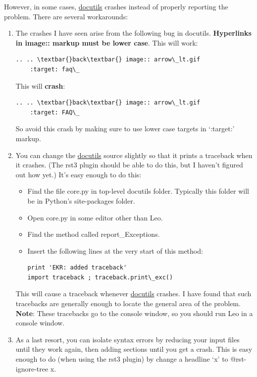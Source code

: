 \documentclass[a4paper,10pt,english]{sphinxmanual}
\begin{document}
However, in some cases, \href{http://docutils.sourceforge.net/}{docutils} crashes instead of properly reporting the
problem. There are several workarounds:
\begin{enumerate}
\item {} 
The crashes I have seen arise from the following bug in docutils.
\textbf{Hyperlinks in image:: markup must be lower case}.  This will work:

\begin{Verbatim}[commandchars=\\\{\}]
.. .. \textbar{}back\textbar{} image:: arrow\_lt.gif
    :target: faq\_
\end{Verbatim}

This will \textbf{crash}:

\begin{Verbatim}[commandchars=\\\{\}]
.. .. \textbar{}back\textbar{} image:: arrow\_lt.gif
    :target: FAQ\_
\end{Verbatim}

So avoid this crash by making sure to use lower case targets in `:target:' markup.

\item {} 
You can change the \href{http://docutils.sourceforge.net/}{docutils} source slightly so that it prints a traceback when it
crashes. (The rst3 plugin should be able to do this, but I haven't figured
out how yet.) It's easy enough to do this:
\begin{itemize}
\item {} 
Find the file core.py in top-level docutils folder.
Typically this folder will be in Python's site-packages folder.

\item {} 
Open core.py in some editor other than Leo.

\item {} 
Find the method called report\_Exceptions.

\item {} 
Insert the following lines at the very start of this method:

\begin{Verbatim}[commandchars=\\\{\}]
print 'EKR: added traceback'
import traceback ; traceback.print\_exc()
\end{Verbatim}

\end{itemize}

This will cause a traceback whenever \href{http://docutils.sourceforge.net/}{docutils} crashes. I have found that
such tracebacks are generally enough to locate the general area of the
problem. \textbf{Note}: These tracebacks go to the console window, so you should
run Leo in a console window.

\item {} 
As a last resort, you can isolate syntax errors by reducing your input files
until they work again, then adding sections until you get a crash. This is
easy enough to do (when using the rst3 plugin) by change a headline `x' to
@rst-ignore-tree x.

\end{enumerate}
\end{document}

